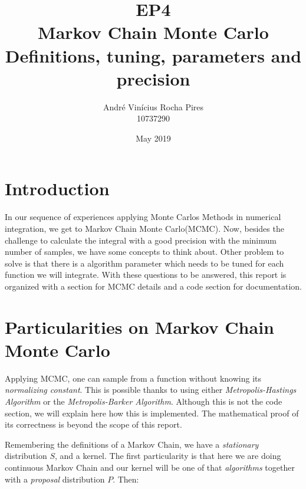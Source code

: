 \documentclass{article}
\title{\Large{EP4} \\ \Large{Markov Chain Monte Carlo} \\ \small{Definitions, tuning, parameters and precision}}
\author{André Vinícius Rocha Pires \\ 10737290}
\date{May 2019}
\begin{document}
\maketitle

\section{Introduction}
In our sequence of experiences applying Monte Carlos Methods in numerical integration, we get to Markov Chain Monte Carlo(MCMC). Now, besides the challenge to calculate the integral with a good precision with the minimum number of samples, we have some concepts to think about. Other problem to solve is that there is a algorithm parameter which needs to be tuned for each function we will integrate. With these questions to be answered, this report is organized with a section for MCMC details and a code section for documentation. 

\section{Particularities on Markov Chain Monte Carlo}

Applying MCMC, one can sample from a function without knowing its \textit{normalizing constant}. This is possible thanks to using either \textit{Metropolis-Hastings Algorithm} or the \textit{Metropolis-Barker Algorithm}. Although this is not the code section, we will explain here how this is implemented. The mathematical proof of its correctness is beyond the scope of this report.

Remembering the definitions of a Markov Chain, we have a \textit{stationary} distribution $S$, and a kernel. The first particularity is that here we are doing continuous Markov Chain and our kernel will be one of that \textit{algorithms} together with a \textit{proposal} distribution $P$. Then:

\vspace{.5cm}
\end{document}
